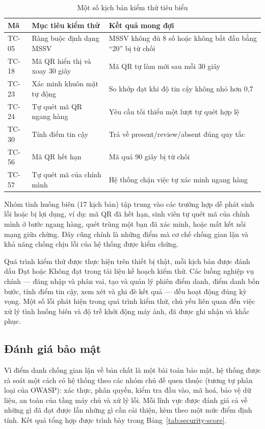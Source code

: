 \documentclass[../main.tex]{subfiles}
\begin{document}
\begin{table}[H]
\centering
\small
\caption{Một số kịch bản kiểm thử tiêu biểu}
\label{tab:test-sample}
\begin{tabular}{|l|p{5.8cm}|p{5.8cm}|}
\hline
\textbf{Mã} & \textbf{Mục tiêu kiểm thử} & \textbf{Kết quả mong đợi} \\
\hline
TC-05 & Ràng buộc định dạng MSSV & MSSV không đủ 8 số hoặc không bắt đầu bằng ``20'' bị từ chối \\ \hline
TC-18 & Mã QR hiển thị và xoay 30 giây & Mã QR tự làm mới sau mỗi 30 giây \\ \hline
TC-23 & Xác minh khuôn mặt tự động & So khớp đạt khi độ tin cậy không nhỏ hơn 0{,}7 \\ \hline
TC-24 & Tự quét mã QR ngang hàng & Yêu cầu tối thiểu một lượt tự quét hợp lệ \\ \hline
TC-30 & Tính điểm tin cậy & Trả về present/review/absent đúng quy tắc \\ \hline
TC-56 & Mã QR hết hạn & Mã quá 90 giây bị từ chối \\ \hline
TC-57 & Tự quét mã của chính mình & Hệ thống chặn việc tự xác minh ngang hàng \\ \hline
\end{tabular}
\end{table}

Nhóm tình huống biên (17 kịch bản) tập trung vào các trường hợp dễ phát sinh lỗi hoặc bị lợi
dụng, ví dụ: mã QR đã hết hạn, sinh viên tự quét mã của chính mình ở bước ngang hàng, quét
trùng một bạn đã xác minh, hoặc mất kết nối mạng giữa chừng. Đây cũng chính là những điểm mà
cơ chế chống gian lận và khả năng chống chịu lỗi của hệ thống được kiểm chứng.

Quá trình kiểm thử được thực hiện trên thiết bị thật, mỗi kịch bản được đánh dấu Đạt hoặc
Không đạt trong tài liệu kế hoạch kiểm thử. Các luồng nghiệp vụ chính --- đăng nhập và phân
vai, tạo và quản lý phiên điểm danh, điểm danh bốn bước, tính điểm tin cậy, xem xét và ghi đè
kết quả --- đều hoạt động đúng kỳ vọng. Một số lỗi phát hiện trong quá trình kiểm thử, chủ yếu
liên quan đến việc xử lý tình huống biên và độ trễ khởi động máy ảnh, đã được ghi nhận và khắc
phục.

\subsection{Đánh giá bảo mật}
\label{sec:bao-mat}

Vì điểm danh chống gian lận về bản chất là một bài toán bảo mật, hệ thống được rà soát một
cách có hệ thống theo các nhóm chủ đề quen thuộc (tương tự phân loại của OWASP): xác thực,
phân quyền, kiểm tra đầu vào, mã hoá, bảo vệ dữ liệu, an toàn của tầng máy chủ và xử lý lỗi.
Mỗi lĩnh vực được đánh giá cả về những gì đã đạt được lẫn những gì cần cải thiện, kèm theo một
mức điểm định tính. Kết quả tổng hợp được trình bày trong Bảng~\ref{tab:security-score}.
\end{document}
